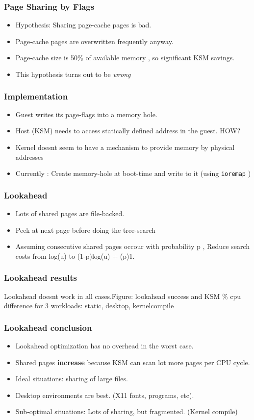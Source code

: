 \documentclass{beamer}
\begin{document}
\begin{frame}
  \frametitle{Page Sharing by Flags}
\begin{itemize}
  \item Hypothesis: Sharing page-cache pages is bad.
  \item Page-cache pages are overwritten frequently anyway.
  \item Page-cache size is 50\% of available memory , so significant KSM savings.
  \item This hypothesis turns out to be \emph{wrong} 
\end{itemize}
\end{frame}

\begin{frame}
  \frametitle{Implementation}
  \begin{itemize}
  \item Guest writes its page-flags into a memory hole. 
  \item Host (KSM) needs to access statically defined address in the guest. \alert{HOW?}
  \item Kernel doesnt seem to have a mechanism to provide memory by physical addresses
  \item \alert{Currently :} Create memory-hole at boot-time and write to it (using \texttt{ioremap} )
  \end{itemize}
\end{frame}

\begin{frame}
  \frametitle{Lookahead}
  \begin{itemize}
  \item Lots of shared pages are file-backed. 
  \item \alert{Peek at next page before doing the tree-search}
  \item Assuming consecutive shared pages occour with probability  p , Reduce search costs from log(u) to (1-p)log(u) + (p)1.
  \end{itemize}
\end{frame}


\begin{frame}
  \frametitle{Lookahead results}
  {Lookahead doesnt work in all cases.Figure: lookahead success and KSM \% cpu difference for 3 workloads: static, desktop, kernelcompile }
\end{frame}

\begin{frame}
  \frametitle{Lookahead conclusion}
  \begin{itemize}
  \item Lookahead optimization has no overhead in the worst case.
  \item Shared pages \textbf{increase} because KSM can scan lot more pages per CPU cycle.
  \item Ideal situations: sharing of large files.
  \item Desktop environments are best. (X11 fonts, programs, etc). 
  \item Sub-optimal situations: Lots of sharing, but fragmented. (Kernel compile)
  \end{itemize}
\end{frame}
\end{document}
